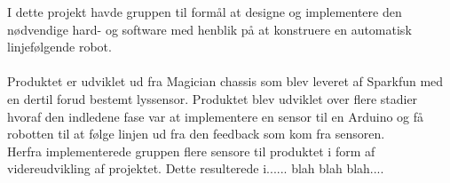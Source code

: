 I dette projekt havde gruppen til formål at designe og implementere den nødvendige hard- og software med henblik på at konstruere en automatisk linjefølgende robot.
\\
\\
Produktet er udviklet ud fra Magician chassis som blev leveret af Sparkfun med en dertil forud bestemt lyssensor. Produktet blev udviklet over flere stadier hvoraf den indledene fase var at implementere en sensor til en Arduino og få robotten til at følge linjen ud fra den feedback som kom fra sensoren. 
\\
Herfra implementerede gruppen flere sensore til produktet i form af videreudvikling af projektet. Dette resulterede i...... blah blah blah....